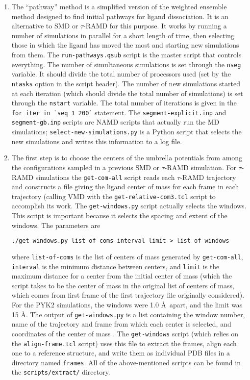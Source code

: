 \documentclass{article}      %
\begin{document}
\begin{enumerate}
\item The ``pathway'' method is a simplified version of the weighted ensemble method designed to find initial pathways for ligand dissociation.  It is an alternative to SMD or $\tau$-RAMD for this purpose.  It works by running a number of simulations in parallel for a short length of time, then selecting those in which the ligand has moved the most and starting new simulations from them.  The \verb+run-pathways.qsub+ script is the master script that controls everything.   The number of simultaneous simulations is set through the \verb+nseg+ variable.  It should divide the total number of processors used (set by the \verb+ntasks+ option in the script header).  The number of new simulations started at each iteration (which should divide the total number of simulations) is set through the \verb+nstart+ variable.  The total number of iterations is given in the \verb+for iter in `seq 1 200`+ statement.   The \verb+segment-explicit.inp+ and \verb+segment-gb.inp+ scripts are NAMD scripts that actually run the MD simulations; \verb+select-new-simulations.py+ is a Python script that selects the new simulations and writes this information to a log file.  


\item The first step is to choose the centers of the umbrella potentials from among the configurations sampled in a previous SMD or $\tau$-RAMD simulation.  For $\tau$-RAMD simulations  the \verb+get-com-all+  script reads each $\tau$-RAMD trajectory and constructs a file giving the ligand center of mass for each frame in each trajectory (calling VMD with the \verb+get-relative-com3.tcl+ script to accomplish its work.  The \verb+get-windows.py+ script actually selects the windows.  This script is important because it selects the spacing and extent of the windows.  The parameters are
\begin{verbatim}
./get-windows.py list-of-coms interval limit > list-of-windows
\end{verbatim}
where \verb+list-of-coms+ is the list of centers of mass generated by \verb+get-com-all+, \verb+interval+ is the minimum distance between centers, and \verb+limit+ is the maximum distance for a center from the initial center of mass (which the script takes to be the center of mass in the original list of centers of mass, which comes from first frame of the first trajectory file originally considered).   For the PYK2 simulations, the windows were 1.0 \AA\ apart, and the limit was 15 \AA. The output of \verb+get-windows.py+ is a list containing the window number, name of the trajectory and frame from which each center is selected, and coordinates of the center of mass .   The \verb+get-windows+ script (which relies on the \verb+align-frame.tcl+ script) uses this file to extract the frames, align each one to a reference structure, and write them as individual PDB files in a directory named \verb+frames+.   All of the above-mentioned scripts can be found in the \verb+scripts/extract/+ directory.


\end{enumerate}
\end{document}
